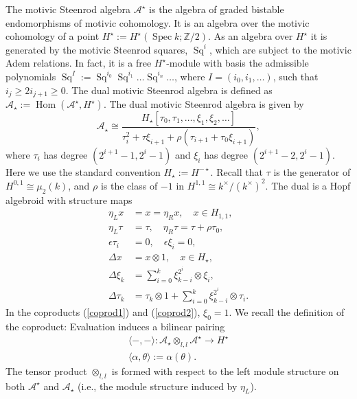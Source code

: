 \documentclass[11pt,hyp]{nyjm}
\newcommand{\A}{\mathcal{A}}
\newcommand{\ZZ}{\mathbb{Z}}
\newcommand{\Hom}{\operatorname{Hom}}
\newcommand{\tensor}{\otimes}
\newcommand{\Spec}{\operatorname{Spec}}
\newcommand{\Sq}{\operatorname{Sq}}
\theoremstyle{theoremstyle}
\theoremstyle{definition}
\theoremstyle{theoremstyle}
\begin{document}
The motivic Steenrod algebra $\A^{\star}$ is the algebra of graded bistable endomorphisms of motivic cohomology.
It is an algebra over the motivic cohomology of a point $H^{\star} := H^{\star}(\Spec k; \ZZ/2)$.
As an algebra over $H^\star$ it is generated by the motivic Steenrod squares, $\Sq^{i}$,
which are subject to the motivic Adem relations.
In fact, it is a free $H^{\star}$-module with basis the admissible polynomials $\Sq^I := \Sq^{i_0} \Sq^{i_{1}} \dots \Sq^{i_n} \dots$, where $I = (i_0, i_1, \dots)$, such that $i_j \geq 2 i_{j+1} \geq 0$.
The dual motivic Steenrod algebra is defined as $\A_\star := \Hom(\A^\star, H^\star)$.
The dual motivic Steenrod algebra is given by
\begin{equation}
\A_\star \cong \frac{H_\star[\tau_0, \tau_1, \ldots, \xi_1, \xi_2, \ldots]}
{\tau_i^2 + \tau \xi_{i+1} + \rho(\tau_{i+1} + \tau_0\xi_{i+1})},
\label{dual}
\end{equation}
where $\tau_i$ has degree $(2^{i+1} - 1, 2^i - 1)$ and $\xi_i$ has degree $(2^{i+1} - 2, 2^i - 1)$.
Here we use the standard convention $H_\star := H^{-\star}$.
Recall that $\tau$ is the generator of $H^{0,1} \cong \mu_2(k)$,
and $\rho$ is the class of $-1$ in $H^{1,1} \cong k^\times/(k^\times)^2$.
The dual is a Hopf algebroid with structure maps
\begin{align}
  \eta_L x &= x = \eta_R x, \quad x \in H_{1,1}, \nonumber \\
  \eta_L\tau &= \tau,\quad  \eta_R\tau = \tau + \rho\tau_0, \nonumber \\
  \epsilon\tau_i &= 0,\quad \epsilon\xi_i = 0, \nonumber \\
  \Delta x &= x \tensor 1,\quad x \in H_\star, \nonumber \\
  \Delta \xi_k &= \sum_{i=0}^k \xi_{k-i}^{2^i} \tensor \xi_i, \label{coprod1} \\
  \Delta \tau_{k} &= \tau_{k} \tensor 1 + \sum_{i=0}^{k} \xi_{k- i}^{2^i}\tensor \tau_i. \label{coprod2}
\end{align}
In the coproducts (\ref{coprod1}) and (\ref{coprod2}), $\xi_0 = 1$.
We recall the definition of the coproduct:
Evaluation induces a bilinear pairing
\begin{align*}
\langle -, -\rangle : \A_\star \tensor_{l,l} \A^\star  \to H^\star \\
\langle \alpha, \theta \rangle := \alpha(\theta).
\end{align*}
The tensor product $\tensor_{l,l}$ is formed with respect to the left module structure on both $\A^\star$ and $\A_\star$ (i.e., the module structure induced by $\eta_L$).
\end{document}
